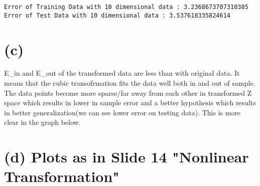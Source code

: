 \documentclass[11pt]{article}
\begin{document}
    \begin{Verbatim}[commandchars=\\\{\}]
Error of Training Data with 10 dimensional data : 3.2368673707310385
Error of Test Data with 10 dimensional data : 3.537618335824614

    \end{Verbatim}

    \section{(c)}\label{c}

E\_in and E\_out of the transformed data are less than with original
data. It means that the cubic transofrmation fits the data well both in
and out of sample. The data points become more sparse/far away from each
other in transformed Z space which results in lower in sample error and
a better hypothesis which results in better generalization(we can see
lower error on testing data). This is more clear in the graph below.

    \section{(d) Plots as in Slide 14 "Nonlinear
Transformation"}\label{d-plots-as-in-slide-14-nonlinear-transformation}
\end{document}

